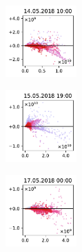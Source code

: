 \begin{figure}[H]
    \centering
    \begin{subfigure}
        \centering
        \includegraphics[width=0.30\textwidth,valign=t]{evaluation/figures/perturbations/perturbation-14.05.2018:10.00-aerosols-mul-1.5.pdf}
    \end{subfigure}
    \begin{subfigure}
        \centering
        \includegraphics[width=0.30\textwidth,valign=t]{evaluation/figures/perturbations/perturbation-15.05.2018:19.00-aerosols-mul-1.5.pdf}
    \end{subfigure}
    \begin{subfigure}
        \centering
        \includegraphics[width=0.30\textwidth,valign=t]{evaluation/figures/perturbations/perturbation-17.05.2018:00.00-aerosols-mul-1.5.pdf}
    \end{subfigure}


\end{figure}
